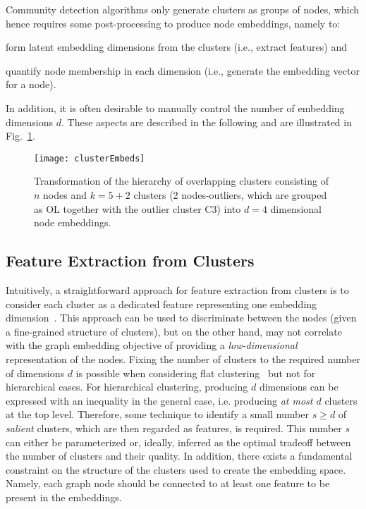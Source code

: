\documentclass[conference]{IEEEtran}
\begin{document}
Community detection algorithms only generate clusters as groups of nodes, which hence requires some post-processing
to produce node embeddings, namely to:
\begin{inparaenum}
\item form latent embedding dimensions from the clusters (i.e., extract features) and
\item quantify node membership in each dimension (i.e., generate the embedding vector for a node).
\end{inparaenum}
In addition, it is often desirable to manually control the number of embedding dimensions $d$.
These aspects are described in the following and are illustrated in Fig.~\ref{fig:clsemb}.
\begin{figure}[htbp]\centering  \texttt{[image: clusterEmbeds]}
\caption{Transformation of the hierarchy of overlapping clusters consisting of $n$ nodes and $k=5+2$ clusters (2 nodes-outliers, which are grouped as OL together with the outlier cluster C3) into $d=4$ dimensional node embeddings.
}
\label{fig:clsemb}
\end{figure}


\subsection{Feature Extraction from Clusters} \label{subsec:features}

Intuitively, a straightforward approach for feature extraction from clusters is to consider each cluster as a dedicated feature representing one embedding dimension~\cite{Tang09}. This approach can be used to discriminate between the nodes (given a fine-grained structure of clusters), but on the other hand, may not correlate with the graph embedding objective of providing a \emph{low-dimensional} representation of the nodes. Fixing the number of clusters to the required number of dimensions $d$ is possible when considering flat clustering~\cite{Tang09} but not for hierarchical cases. For hierarchical clustering, producing $d$ dimensions can be expressed with an inequality in the general case, i.e. producing \emph{at most $d$} clusters at the top level.
Therefore, some technique to identify a small number $s \ge d$ of \emph{salient} clusters, which are then regarded as features, is required.  This number $s$ can either be parameterized or, ideally, inferred as the optimal tradeoff between the number of clusters and their quality. In addition, there exists a fundamental constraint on the structure of the clusters used to create the embedding space. Namely, each graph node should be connected to at least one feature to be present in the embeddings.
\end{document}
